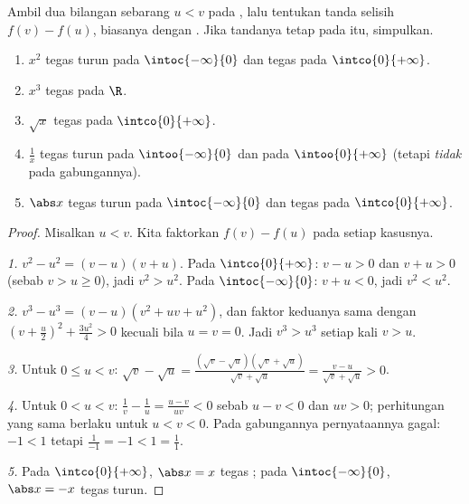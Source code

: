 \begin{method}\label{met:g11:func:variation}
Ambil dua bilangan sebarang $u < v$ pada , lalu tentukan tanda
selisih $f(v) - f(u)$, biasanya dengan \emph{}. Jika
tandanya tetap pada  itu, simpulkan.
\end{method}

\begin{proposition}\label{prop:g11:func:refvariations}
\begin{enumerate}
  \item $x^2$ tegas turun pada $\intoc{-\infty}{0}$ dan tegas
         pada $\intco{0}{+\infty}$.
  \item $x^3$ tegas  pada $\R$.
  \item $\sqrt x$ tegas  pada $\intco{0}{+\infty}$.
  \item $\frac1x$ tegas turun pada $\intoo{-\infty}{0}$ dan pada
        $\intoo{0}{+\infty}$ (tetapi \emph{tidak} pada gabungannya).
  \item $\abs x$ tegas turun pada $\intoc{-\infty}{0}$ dan
        tegas  pada $\intco{0}{+\infty}$.
\end{enumerate}
\end{proposition}

\begin{proof}
Misalkan $u < v$. Kita faktorkan $f(v) - f(u)$ pada setiap kasusnya.

\emph{1.} $v^2 - u^2 = (v-u)(v+u)$. Pada $\intco{0}{+\infty}$: $v - u > 0$
dan $v + u > 0$ (sebab $v > u \geq 0$), jadi $v^2 > u^2$. Pada
$\intoc{-\infty}{0}$: $v + u < 0$, jadi $v^2 < u^2$.

\emph{2.} $v^3 - u^3 = (v - u)(v^2 + uv + u^2)$, dan faktor keduanya
sama dengan $\left(v + \frac u2\right)^2 + \frac{3u^2}{4} > 0$ kecuali bila
$u = v = 0$. Jadi $v^3 > u^3$ setiap kali $v > u$.

\emph{3.} Untuk $0 \leq u < v$:
$\sqrt v - \sqrt u = \frac{(\sqrt v - \sqrt u)(\sqrt v + \sqrt u)}
{\sqrt v + \sqrt u} = \frac{v - u}{\sqrt v + \sqrt u} > 0$.

\emph{4.} Untuk $0 < u < v$:
$\frac1v - \frac1u = \frac{u - v}{uv} < 0$ sebab $u - v < 0$ dan $uv > 0$;
perhitungan yang sama berlaku untuk $u < v < 0$. Pada gabungannya
pernyataannya gagal: $-1 < 1$ tetapi $\frac{1}{-1} = -1 < 1 = \frac11$.

\emph{5.} Pada $\intco{0}{+\infty}$, $\abs x = x$ tegas ; pada
$\intoc{-\infty}{0}$, $\abs x = -x$ tegas turun.
\end{proof}

